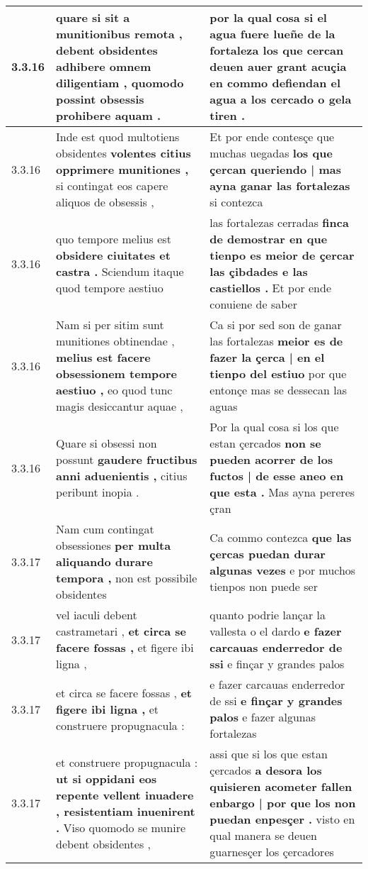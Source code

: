 \begin{tabular}{|p{1cm}|p{6.5cm}|p{6.5cm}|}
3.3.16 & quare si sit a munitionibus remota , \textbf{ debent obsidentes adhibere omnem diligentiam , } quomodo possint obsessis prohibere aquam . & por la qual cosa si el agua fuere lueñe de la fortaleza \textbf{ los que cercan deuen auer grant acuçia } en commo defiendan el agua a los cercado o gela tiren . \\\hline
3.3.16 & Inde est quod multotiens obsidentes \textbf{ volentes citius opprimere munitiones , } si contingat eos capere aliquos de obsessis , & Et por ende contesçe que muchas uegadas \textbf{ los que çercan queriendo | mas ayna ganar las fortalezas } si contezca \\\hline
3.3.16 & quo tempore melius est \textbf{ obsidere ciuitates et castra . } Sciendum itaque quod tempore aestiuo & las fortalezas cerradas \textbf{ finca de demostrar en que tienpo es meior de çercar las çibdades e las castiellos . } Et por ende conuiene de saber \\\hline
3.3.16 & Nam si per sitim sunt munitiones obtinendae , \textbf{ melius est facere obsessionem tempore aestiuo , } eo quod tunc magis desiccantur aquae , & Ca si por sed son de ganar las fortalezas \textbf{ meior es de fazer la çerca | en el tienpo del estiuo } por que entonçe mas se dessecan las aguas \\\hline
3.3.16 & Quare si obsessi non possunt \textbf{ gaudere fructibus anni aduenientis , } citius peribunt inopia . & Por la qual cosa si los que estan çercados \textbf{ non se pueden acorrer de los fuctos | de esse aneo en que esta . } Mas ayna pereres çran \\\hline
3.3.17 & Nam cum contingat obsessiones \textbf{ per multa aliquando durare tempora , } non est possibile obsidentes & Ca commo contezca \textbf{ que las çercas puedan durar algunas vezes } e por muchos tienpos non puede ser \\\hline
3.3.17 & vel iaculi debent castrametari , \textbf{ et circa se facere fossas , } et figere ibi ligna , & quanto podrie lançar la vallesta o el dardo \textbf{ e fazer carcauas enderredor de ssi } e finçar y grandes palos \\\hline
3.3.17 & et circa se facere fossas , \textbf{ et figere ibi ligna , } et construere propugnacula : & e fazer carcauas enderredor de ssi \textbf{ e finçar y grandes palos } e fazer algunas fortalezas \\\hline
3.3.17 & et construere propugnacula : \textbf{ ut si oppidani eos repente vellent inuadere , resistentiam inuenirent . } Viso quomodo se munire debent obsidentes , & assi que si los que estan çercados \textbf{ a desora los quisieren acometer fallen enbargo | por que los non puedan enpesçer . } visto en qual manera se deuen guarnesçer los çercadores \\\hline

\end{tabular}
